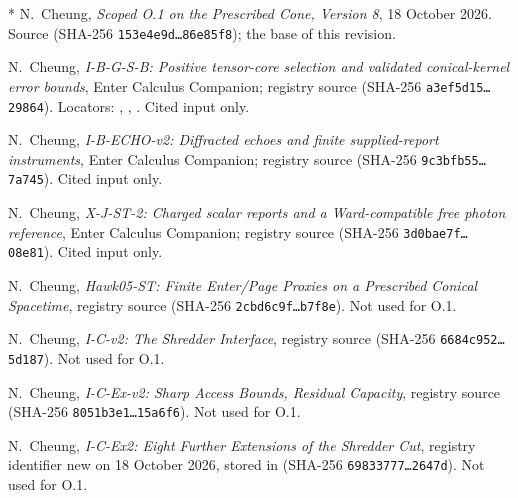 * N.~Cheung,
\emph{Scoped O.1 on the Prescribed Cone, Version 8},
18 October 2026. Source 
(SHA-256 \texttt{153e4e9d\ldots86e85f8}); the base of this revision.

\ddag N.~Cheung,
\emph{I-B-G-S-B: Positive tensor-core selection and validated
conical-kernel error bounds},
Enter Calculus Companion; registry source 
(SHA-256 \texttt{a3ef5d15\ldots29864}).
Locators: , ,
. Cited input only.

\ddag N.~Cheung,
\emph{I-B-ECHO-v2: Diffracted echoes and finite supplied-report
instruments}, Enter Calculus Companion; registry source
(SHA-256 \texttt{9c3bfb55\ldots7a745}). Cited input only.

\ddag N.~Cheung,
\emph{X-J-ST-2: Charged scalar reports and a Ward-compatible free
photon reference}, Enter Calculus Companion; registry source
(SHA-256 \texttt{3d0bae7f\ldots 08e81}). Cited input only.

\ddag N.~Cheung,
\emph{Hawk05-ST: Finite Enter/Page Proxies on a Prescribed Conical
Spacetime}, registry source (SHA-256 \texttt{2cbd6c9f\ldots b7f8e}).
Not used for O.1.

\ddag N.~Cheung,
\emph{I-C-v2: The Shredder Interface}, registry source
(SHA-256 \texttt{6684c952\ldots 5d187}). Not used for O.1.

\ddag N.~Cheung,
\emph{I-C-Ex-v2: Sharp Access Bounds, Residual Capacity}, registry
source (SHA-256 \texttt{8051b3e1\ldots 15a6f6}). Not used for O.1.

\ddag N.~Cheung,
\emph{I-C-Ex2: Eight Further Extensions of the Shredder Cut},
registry identifier new on 18 October 2026, stored in
 (SHA-256 \texttt{69833777\ldots 2647d}).
Not used for O.1.
